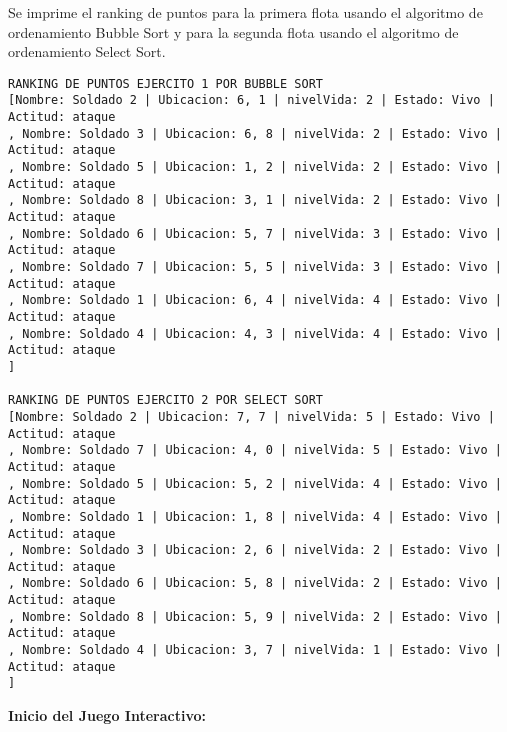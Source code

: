 Se imprime el ranking de puntos para la primera flota usando el algoritmo de ordenamiento Bubble Sort y para la segunda flota usando el algoritmo de ordenamiento Select Sort.
\begin{lstlisting}
RANKING DE PUNTOS EJERCITO 1 POR BUBBLE SORT
[Nombre: Soldado 2 | Ubicacion: 6, 1 | nivelVida: 2 | Estado: Vivo | Actitud: ataque
, Nombre: Soldado 3 | Ubicacion: 6, 8 | nivelVida: 2 | Estado: Vivo | Actitud: ataque
, Nombre: Soldado 5 | Ubicacion: 1, 2 | nivelVida: 2 | Estado: Vivo | Actitud: ataque
, Nombre: Soldado 8 | Ubicacion: 3, 1 | nivelVida: 2 | Estado: Vivo | Actitud: ataque
, Nombre: Soldado 6 | Ubicacion: 5, 7 | nivelVida: 3 | Estado: Vivo | Actitud: ataque
, Nombre: Soldado 7 | Ubicacion: 5, 5 | nivelVida: 3 | Estado: Vivo | Actitud: ataque
, Nombre: Soldado 1 | Ubicacion: 6, 4 | nivelVida: 4 | Estado: Vivo | Actitud: ataque
, Nombre: Soldado 4 | Ubicacion: 4, 3 | nivelVida: 4 | Estado: Vivo | Actitud: ataque
]

RANKING DE PUNTOS EJERCITO 2 POR SELECT SORT
[Nombre: Soldado 2 | Ubicacion: 7, 7 | nivelVida: 5 | Estado: Vivo | Actitud: ataque
, Nombre: Soldado 7 | Ubicacion: 4, 0 | nivelVida: 5 | Estado: Vivo | Actitud: ataque
, Nombre: Soldado 5 | Ubicacion: 5, 2 | nivelVida: 4 | Estado: Vivo | Actitud: ataque
, Nombre: Soldado 1 | Ubicacion: 1, 8 | nivelVida: 4 | Estado: Vivo | Actitud: ataque
, Nombre: Soldado 3 | Ubicacion: 2, 6 | nivelVida: 2 | Estado: Vivo | Actitud: ataque
, Nombre: Soldado 6 | Ubicacion: 5, 8 | nivelVida: 2 | Estado: Vivo | Actitud: ataque
, Nombre: Soldado 8 | Ubicacion: 5, 9 | nivelVida: 2 | Estado: Vivo | Actitud: ataque
, Nombre: Soldado 4 | Ubicacion: 3, 7 | nivelVida: 1 | Estado: Vivo | Actitud: ataque
]
\end{lstlisting}

\textbf{Inicio del Juego Interactivo:}

